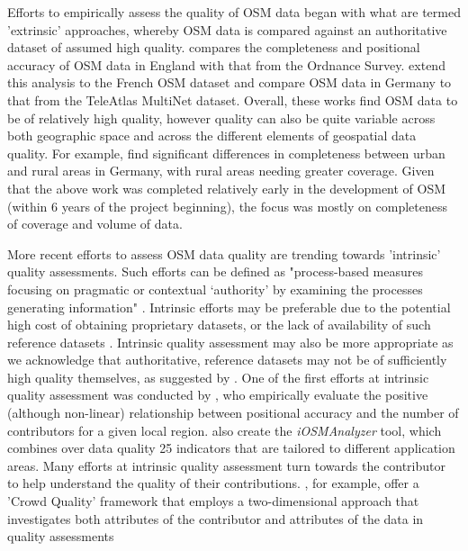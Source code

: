 Efforts to empirically assess the quality of OSM data began with what are termed 'extrinsic' approaches, whereby OSM data is compared against an authoritative dataset of assumed high quality. \textcite{haklay_how_2010} compares the completeness and positional accuracy of OSM data in England with that from the Ordnance Survey. \textcite{girres_quality_2010} extend this analysis to the French OSM dataset and \textcite{zielstra_comparative_2010} compare OSM data in Germany to that from the TeleAtlas MultiNet dataset. Overall, these works find OSM data to be of relatively high quality, however quality can also be quite variable across both geographic space and across the different elements of geospatial data quality. For example, \textcite{zielstra_comparative_2010} find significant differences in completeness between urban and rural areas in Germany, with rural areas needing greater coverage. Given that the above work was completed relatively early in the development of OSM (within 6 years of the project beginning), the focus was mostly on completeness of coverage and volume of data.  

More recent efforts to assess OSM data quality are trending towards 'intrinsic' quality assessments. Such efforts can be defined as "process-based measures focusing on pragmatic or contextual ‘authority’ by examining the processes generating information" \parencite[p. 297]{anderson_crowd_2018}. Intrinsic efforts may be preferable due to the potential high cost of obtaining proprietary datasets, or the lack of availability of such reference datasets \parencite{estes_maps_1994}. Intrinsic quality assessment may also be more appropriate as we acknowledge that authoritative, reference datasets may not be of sufficiently high quality themselves, as suggested by \textcite[p. 112]{goodchild_assuring_2012}. One of the first efforts at intrinsic quality assessment was conducted by \textcite{haklay_how_2010-1}, who empirically evaluate the positive (although non-linear) relationship between positional accuracy and the number of contributors for a given local region. \textcite{barron_comprehensive_2014} also create the \textit{iOSMAnalyzer} tool, which combines over data quality 25 indicators that are tailored to different application areas. Many efforts at intrinsic quality assessment turn towards the contributor to help understand the quality of their contributions. \textcite{van_exel_impact_2010}, for example, offer a 'Crowd Quality' framework that employs a two-dimensional approach that investigates both attributes of the contributor and attributes of the data in quality assessments 

